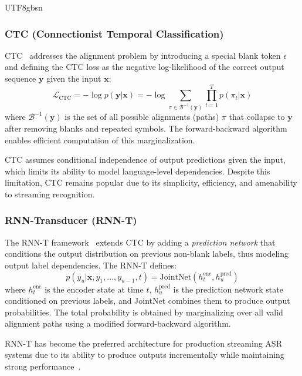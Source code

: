 \documentclass[12pt,a4paper]{article}
\begin{document}
\begin{CJK}{UTF8}{gbsn}
\subsubsection{CTC (Connectionist Temporal Classification)}

CTC~\cite{graves2006connectionist} addresses the alignment problem by introducing a special blank token $\epsilon$ and defining the CTC loss as the negative log-likelihood of the correct output sequence $\mathbf{y}$ given the input $\mathbf{x}$:
\begin{equation}
    \mathcal{L}_{\text{CTC}} = -\log p(\mathbf{y} | \mathbf{x}) = -\log \sum_{\pi \in \mathcal{B}^{-1}(\mathbf{y})} \prod_{t=1}^{T} p(\pi_t | \mathbf{x})
\end{equation}
where $\mathcal{B}^{-1}(\mathbf{y})$ is the set of all possible alignments (paths) $\pi$ that collapse to $\mathbf{y}$ after removing blanks and repeated symbols. The forward-backward algorithm enables efficient computation of this marginalization.

CTC assumes conditional independence of output predictions given the input, which limits its ability to model language-level dependencies. Despite this limitation, CTC remains popular due to its simplicity, efficiency, and amenability to streaming recognition.

\subsubsection{RNN-Transducer (RNN-T)}

The RNN-T framework~\cite{graves2012sequence} extends CTC by adding a \textit{prediction network} that conditions the output distribution on previous non-blank labels, thus modeling output label dependencies. The RNN-T defines:
\begin{equation}
    p(y_u | \mathbf{x}, y_1, \ldots, y_{u-1}, t) = \text{JointNet}(h_t^{\text{enc}}, h_u^{\text{pred}})
\end{equation}
where $h_t^{\text{enc}}$ is the encoder state at time $t$, $h_u^{\text{pred}}$ is the prediction network state conditioned on previous labels, and JointNet combines them to produce output probabilities. The total probability is obtained by marginalizing over all valid alignment paths using a modified forward-backward algorithm.

RNN-T has become the preferred architecture for production streaming ASR systems due to its ability to produce outputs incrementally while maintaining strong performance~\cite{he2019streaming,gulati2020conformer}.


\end{CJK}
\end{document}
